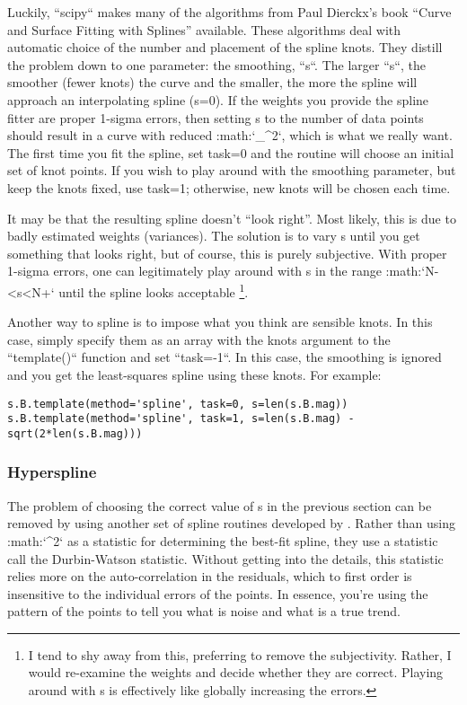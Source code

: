 Luckily, ``scipy`` makes many of the algorithms from Paul Dierckx's
book ``Curve and Surface Fitting with Splines'' \citep{Dierckx1993}
available. These algorithms deal with automatic choice of the number
and placement of the spline knots. They distill the problem down to
one parameter: the smoothing, ``s``. The larger ``s``, the
smoother (fewer knots) the curve and the smaller, the more the spline
will approach an interpolating spline (s=0). If the weights you provide
the spline fitter are proper 1-sigma errors, then setting s to the
number of data points should result in a curve with reduced :math:`\chi_{\nu}^{2}`,
which is what we really want. The first time you fit the spline, set
task=0 and the routine will choose an initial set of knot points.
If you wish to play around with the smoothing parameter, but keep
the knots fixed, use task=1; otherwise, new knots will be chosen each
time.

It may be that the resulting spline doesn't ``look right''. Most
likely, this is due to badly estimated weights (variances). The solution
is to vary s until you get something that looks right, but of course,
this is purely subjective. With proper 1-sigma errors, one can legitimately
play around with s in the range :math:`N-<s<N+` until
the spline looks acceptable%
\footnote{I tend to shy away from this, preferring to remove the subjectivity.
Rather, I would re-examine the weights and decide whether they are
correct. Playing around with s is effectively like globally increasing
the errors.%
}.

Another way to spline is to impose what you think are sensible knots.
In this case, simply specify them as an array with the knots argument
to the ``template()`` function and set ``task=-1``. In this
case, the smoothing is ignored and you get the least-squares spline
using these knots. For example:

\begin{verbatim}
s.B.template(method='spline', task=0, s=len(s.B.mag))
s.B.template(method='spline', task=1, s=len(s.B.mag) - sqrt(2*len(s.B.mag)))
\end{verbatim}


\subsubsection{Hyperspline}

The problem of choosing the correct value of s in the previous section
can be removed by using another set of spline routines developed by
\citet{297968}. Rather than using :math:`\chi^{2}` as a statistic for
determining the best-fit spline, they use a statistic call the Durbin-Watson
statistic. Without getting into the details, this statistic relies
more on the auto-correlation in the residuals, which to first order
is insensitive to the individual errors of the points. In essence,
you're using the pattern of the points to tell you what is noise and
what is a true trend.

